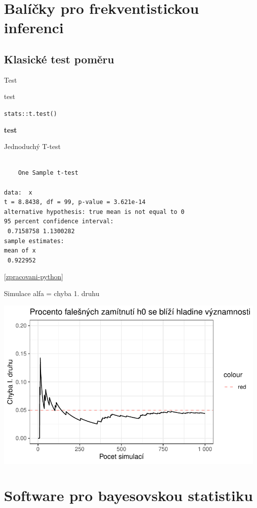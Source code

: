 \documentclass[
  11pt,
  a4paper]{report}
\begin{document}
\section{Balíčky pro frekventistickou
inferenci}\label{baluxedux10dky-pro-frekventistickou-inferenci}

\subsection{Klasické test poměru}\label{klasickuxe9-test-pomux11bru}

Test

test

\texttt{stats::t.test()}

\textbf{test}

Jednoduchý T-test

\begin{verbatim}

    One Sample t-test

data:  x
t = 8.8438, df = 99, p-value = 3.621e-14
alternative hypothesis: true mean is not equal to 0
95 percent confidence interval:
 0.7158758 1.1300282
sample estimates:
mean of x 
 0.922952 
\end{verbatim}

\ref{zpracovani-python}

Simulace alfa = chyba 1. druhu

\includegraphics{index_files/figure-pdf/unnamed-chunk-4-1.pdf}

\section{Software pro bayesovskou
statistiku}\label{software-pro-bayesovskou-statistiku}
\end{document}
